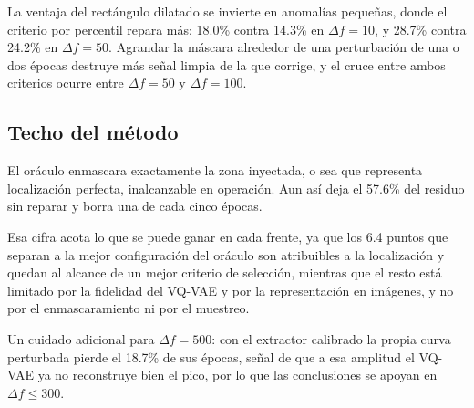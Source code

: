 La ventaja del rectángulo dilatado se invierte en anomalías pequeñas, donde el criterio por percentil repara más: 18.0\% contra 14.3\% en $\Delta f = 10$, y 28.7\% contra 24.2\% en $\Delta f = 50$. Agrandar la máscara alrededor de una perturbación de una o dos épocas destruye más señal limpia de la que corrige, y el cruce entre ambos criterios ocurre entre $\Delta f = 50$ y $\Delta f = 100$.

\subsection{Techo del método}

El oráculo enmascara exactamente la zona inyectada, o sea que representa localización perfecta, inalcanzable en operación. Aun así deja el 57.6\% del residuo sin reparar y borra una de cada cinco épocas.

Esa cifra acota lo que se puede ganar en cada frente, ya que los 6.4 puntos que separan a la mejor configuración del oráculo son atribuibles a la localización y quedan al alcance de un mejor criterio de selección, mientras que el resto está limitado por la fidelidad del VQ-VAE y por la representación en imágenes, y no por el enmascaramiento ni por el muestreo.

Un cuidado adicional para $\Delta f = 500$: con el extractor calibrado la propia curva perturbada pierde el 18.7\% de sus épocas, señal de que a esa amplitud el VQ-VAE ya no reconstruye bien el pico, por lo que las conclusiones se apoyan en $\Delta f \leq 300$.